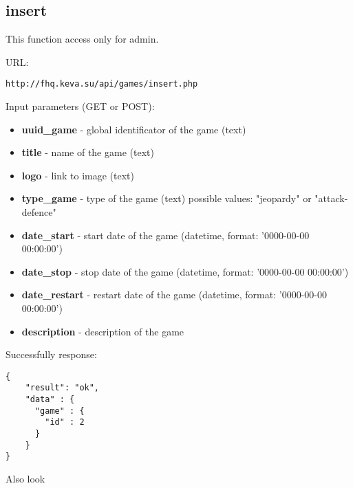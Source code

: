 \subsection{insert}
\par

This function access only for admin.

URL:
\begin{Verbatim}[frame=single]
http://fhq.keva.su/api/games/insert.php
\end{Verbatim}

Input parameters (GET or POST):
\begin{itemize}
  \item \textbf{uuid\_game} - global identificator of the game (text)
  \item \textbf{title} - name of the game (text)
  \item \textbf{logo} - link to image (text)
  \item \textbf{type\_game} - type of the game (text) possible values: "jeopardy" or "attack-defence"
  \item \textbf{date\_start} - start date of the game (datetime, format:  '0000-00-00 00:00:00')
  \item \textbf{date\_stop} - stop date of the game (datetime, format:  '0000-00-00 00:00:00')
  \item \textbf{date\_restart} - restart date of the game (datetime, format:  '0000-00-00 00:00:00')
  \item \textbf{description} - description of the game
\end{itemize}

Successfully response:  \\
\begin{Verbatim}[frame=single]
{
    "result": "ok",
    "data" : {
      "game" : {
        "id" : 2
      }
    }
}
\end{Verbatim}

Also look ~